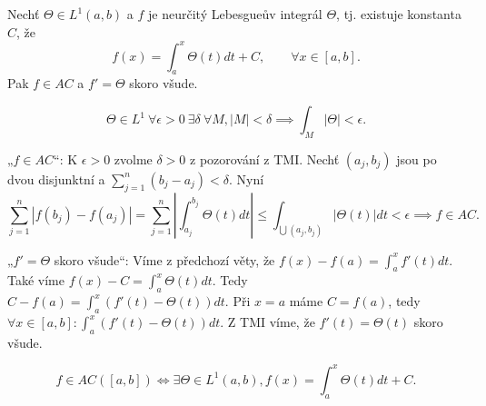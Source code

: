\documentclass[12pt]{article}					%
\begin{document}
	\begin{veta}
		Nechť $\Theta \in L^1(a, b)$ a $f$ je neurčitý Lebesgueův integrál $\Theta$, tj. existuje konstanta $C$, že
		$$ f(x) = \int_a^x \Theta(t) dt + C, \qquad \forall x \in [a, b]. $$
		Pak $f \in AC$ a $f' = \Theta$ skoro všude.

		\begin{tvrzeni}
			$$ \Theta \in L^1\ \forall \epsilon > 0\ \exists \delta\ \forall M, |M| < \delta \implies \int_M |\Theta| < \epsilon. $$
		\end{tvrzeni}

		\begin{dukazin}
			„$f \in AC$“: K $\epsilon > 0$ zvolme $\delta > 0$ z pozorování z TMI. Nechť $(a_j, b_j)$ jsou po dvou disjunktní a $\sum_{j=1}^n (b_j - a_j) < \delta$. Nyní
			$$ \sum_{j=1}^n |f(b_j) - f(a_j)| = \sum_{j=1}^n |\int_{a_j}^{b_j} \Theta(t) dt| ≤ \int_{\bigcup (a_j, b_j)} |\Theta(t)| dt < \epsilon \implies f \in AC. $$

			„$f' = \Theta$ skoro všude“: Víme z předchozí věty, že $f(x) - f(a) = \int_a^x f'(t) dt$. Také víme $f(x) - C = \int_a^x \Theta(t) dt$. Tedy $C - f(a) = \int_a^x (f'(t) - \Theta(t)) dt$. Při $x = a$ máme $C = f(a)$, tedy $\forall x \in [a, b]: \int_a^x (f'(t) - \Theta(t)) dt$. Z TMI víme, že $f'(t) = \Theta(t)$ skoro všude.
		\end{dukazin}
	\end{veta}

	\begin{dusledek}
		$$ f \in AC ([a, b]) \Leftrightarrow \exists \Theta \in L^1(a, b), f(x) = \int_a^x \Theta(t) dt + C. $$
	\end{dusledek}

\end{document}
